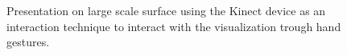 \documentclass[journal]{vgtc}                %
\begin{document}
\begin{figure}[tb]
	\centering
	\caption{Presentation on large scale surface using the Kinect device as an interaction technique to interact with the visualization trough hand gestures.}
	\label{img:dome_clip}
\end{figure}

\end{document}
